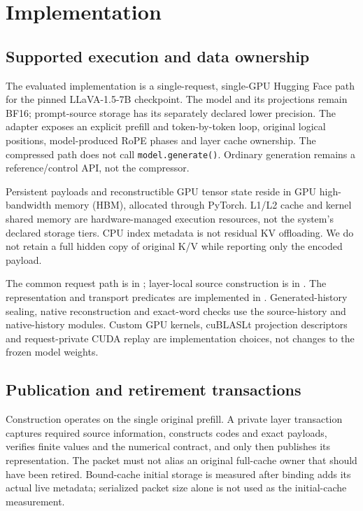 \section{Implementation}
\label{sec:implementation}
\subsection{Supported execution and data ownership}
The evaluated implementation is a single-request, single-GPU Hugging Face
path for the pinned LLaVA-1.5-7B checkpoint. The model and its projections
remain BF16; prompt-source storage has its separately declared lower
precision. The adapter exposes an explicit prefill and token-by-token loop,
original logical positions, model-produced RoPE phases and layer cache
ownership. The compressed path does not call \texttt{model.generate()}.
Ordinary generation remains a reference/control API, not the compressor.

Persistent payloads and reconstructible GPU tensor state reside in GPU
high-bandwidth memory (HBM), allocated through PyTorch. L1/L2 cache and
kernel shared memory are hardware-managed execution resources, not the
system's declared storage tiers. CPU index metadata is not residual KV
offloading. We do not retain a full hidden copy of original K/V while
reporting only the encoded payload.

The common request path is in
; layer-local source
construction is in .
The representation and transport predicates are implemented in
. Generated-history sealing,
native reconstruction and exact-word checks use the source-history and
native-history modules. Custom GPU kernels, cuBLASLt projection descriptors
and request-private CUDA replay are implementation choices, not changes to
the frozen model weights.

\subsection{Publication and retirement transactions}
Construction operates on the single original prefill. A private layer
transaction captures required source information, constructs codes and
exact payloads, verifies finite values and the numerical contract, and only
then publishes its representation. The packet must not alias an original
full-cache owner that should have been retired. Bound-cache initial storage
is measured after binding adds its actual live metadata; serialized packet
size alone is not used as the initial-cache measurement.

